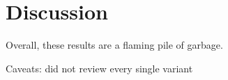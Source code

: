 
\chapter{Discussion}
\label{ch:Discussion}

Overall, these results are a flaming pile of garbage.

Caveats: did not review every single variant
